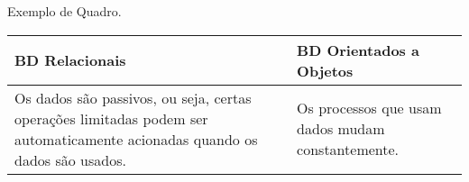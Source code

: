 \begin{quadro}[!htb]
    \centering
    \caption{Exemplo de Quadro.\label{qua:quadro-exemplo1}}
    \begin{tabular}{|p{7.5cm}|p{7.5cm}|}
        \hline
        \textbf{BD Relacionais} & \textbf{BD Orientados a Objetos} \\
        \hline
        Os dados são passivos, ou seja, certas operações limitadas podem ser automaticamente acionadas quando os dados são usados. & Os processos que usam dados mudam constantemente. \\
        \hline
    \end{tabular}
\end{quadro}
